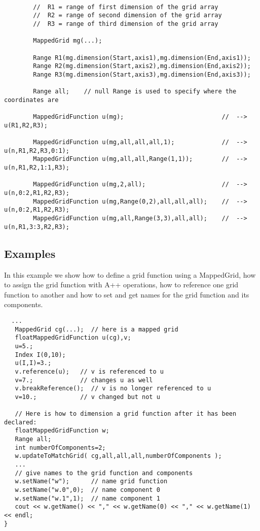 {\footnotesize\begin{verbatim}

        //  R1 = range of first dimension of the grid array
        //  R2 = range of second dimension of the grid array
        //  R3 = range of third dimension of the grid array 

        MappedGrid mg(...);

        Range R1(mg.dimension(Start,axis1),mg.dimension(End,axis1));
        Range R2(mg.dimension(Start,axis2),mg.dimension(End,axis2));
        Range R3(mg.dimension(Start,axis3),mg.dimension(End,axis3));

        Range all;    // null Range is used to specify where the coordinates are

        MappedGridFunction u(mg);                           //  --> u(R1,R2,R3);

        MappedGridFunction u(mg,all,all,all,1);             //  --> u(n,R1,R2,R3,0:1);
        MappedGridFunction u(mg,all,all,Range(1,1));        //  --> u(n,R1,R2,1:1,R3);

        MappedGridFunction u(mg,2,all);                     //  --> u(n,0:2,R1,R2,R3);
        MappedGridFunction u(mg,Range(0,2),all,all,all);    //  --> u(n,0:2,R1,R2,R3);
        MappedGridFunction u(mg,all,Range(3,3),all,all);    //  --> u(n,R1,3:3,R2,R3);

\end{verbatim}
}


\subsection{Examples}

In this example we show how to define a grid function using
a {\ff MappedGrid}, how to assign the grid function with
A++ operations, how to reference one grid function to
another and how to set and get names for the grid function
and its components.
{\footnotesize\begin{verbatim}
  ...
   MappedGrid cg(...);  // here is a mapped grid
   floatMappedGridFunction u(cg),v;
   u=5.;
   Index I(0,10);
   u(I,I)=3.;
   v.reference(u);   // v is referenced to u
   v=7.;             // changes u as well
   v.breakReference();  // v is no longer referenced to u
   v=10.;            // v changed but not u

   // Here is how to dimension a grid function after it has been declared:
   floatMappedGridFunction w;
   Range all;
   int numberOfComponents=2;
   w.updateToMatchGrid( cg,all,all,all,numberOfComponents );  
   ...
   // give names to the grid function and components
   w.setName("w");      // name grid function
   w.setName("w.0",0);  // name component 0
   w.setName("w.1",1);  // name component 1
   cout << w.getName() << "," << w.getName(0) << "," << w.getName(1) << endl;
}
\end{verbatim}
}





